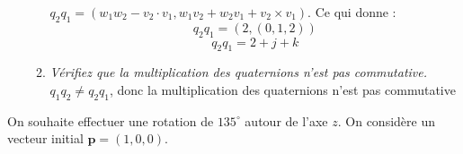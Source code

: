 \documentclass[a4paper,12pt]{article}
\begin{document}
\begin{enumerate}
\begin{enumerate}
              \( q_2 q_1 = (w_1 w_2 − v_2 \cdot v_1, w_1 v_2 + w_2 v_1 + v_2 \times v_1) \). \newline
              Ce qui donne :
              \begin{equation}
              q_2 q_1 = (2, (0, 1, 2))
              \end{equation}
              \begin{equation}
              \boxed{q_2 q_1 = 2 + j + k}
              \end{equation}
              \item \emph{Vérifiez que la multiplication des quaternions n’est pas commutative.} \newline \newline
              \(q_1 q_2 \neq q_2 q_1\), donc la multiplication des quaternions n'est pas commutative
          \end{enumerate}
\end{enumerate}



On souhaite effectuer une rotation de $135^\circ$ autour de l’axe $z$. On considère un vecteur initial $\mathbf{p} = (1, 0, 0)$.
\end{document}
